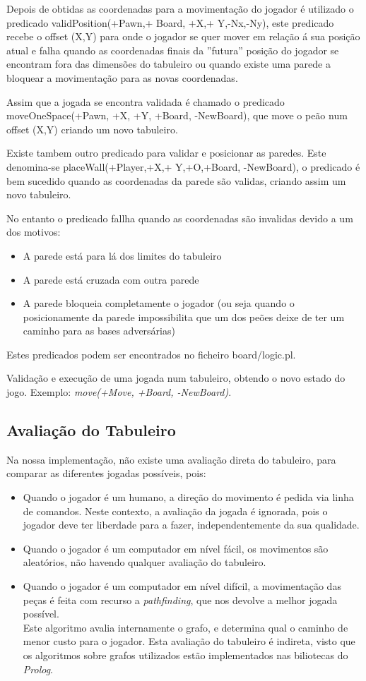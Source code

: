 \documentclass[a4paper]{article}
\begin{document}
Depois de obtidas as coordenadas para a movimentação do jogador é utilizado o predicado validPosition(+Pawn,+ Board, +X,+ Y,-Nx,-Ny), este predicado recebe o offset (X,Y) para onde o jogador se quer mover em relação á sua posição atual e falha quando as coordenadas finais da ''futura'' posição do jogador se encontram fora das dimensões do tabuleiro ou quando existe uma parede a bloquear a movimentação para as novas coordenadas.
\par Assim que a jogada se encontra validada é chamado o predicado moveOneSpace(+Pawn, +X, +Y, +Board, -NewBoard), que move o peão num offset (X,Y) criando um novo tabuleiro.
\par Existe tambem outro predicado para validar e posicionar as paredes. Este denomina-se placeWall(+Player,+X,+ Y,+O,+Board, -NewBoard),  o predicado é bem sucedido quando as coordenadas da parede são validas, criando assim um novo tabuleiro.
\par No entanto o predicado fallha quando as coordenadas são invalidas devido a um dos motivos:
\begin{itemize}
\item A parede está para lá dos limites do tabuleiro
\item A parede está cruzada com outra parede
\item A parede bloqueia completamente o jogador (ou seja quando o posicionamente da parede impossibilita que um dos peões deixe de ter um caminho para as bases adversárias)
\end{itemize}

Estes predicados podem ser encontrados no ficheiro board/logic.pl.


Validação e execução de uma jogada num tabuleiro, obtendo o novo estado do jogo. Exemplo: \textit{move(+Move, +Board, -NewBoard)}.

\subsection{Avaliação do Tabuleiro} Na nossa implementação, não existe uma avaliação direta do tabuleiro, para comparar as diferentes jogadas possíveis, pois:
\begin{itemize}
	\item Quando o jogador é um humano, a direção do movimento é pedida via linha de comandos. Neste contexto, a avaliação da jogada é ignorada, pois o jogador deve ter liberdade para a fazer, independentemente da sua qualidade.
	
	\item Quando o jogador é um computador em nível fácil, os movimentos são aleatórios, não havendo qualquer avaliação do tabuleiro.
	
	\item Quando o jogador é um computador em nível difícil, a movimentação das peças é feita com recurso a \textit{pathfinding}, que nos devolve a melhor jogada possível. \\
Este algoritmo avalia internamente o grafo, e determina qual o caminho de menor custo para o jogador. Esta avaliação do tabuleiro é indireta, visto que os algoritmos sobre grafos utilizados estão implementados nas biliotecas do \textit{Prolog}.
\end{itemize}
\end{document}
